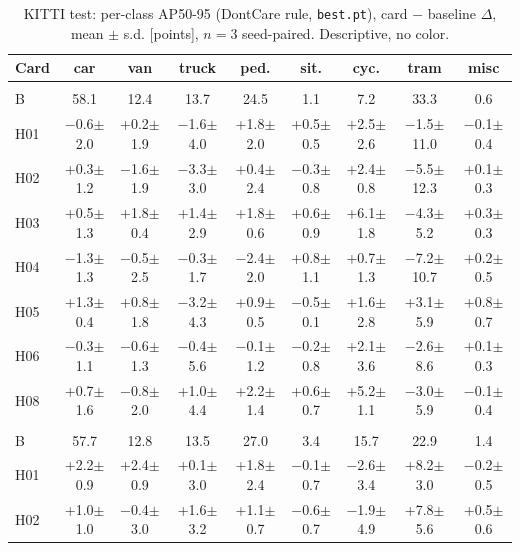 \begin{table}[!htbp]
\centering\small\setlength{\tabcolsep}{2pt}
\caption{KITTI test: per-class AP50-95 (DontCare rule, \texttt{best.pt}), card $-$ baseline $\Delta$, mean $\pm$ s.d. [points], $n=3$ seed-paired. Descriptive, no color.}\label{tab:kitti-sinif}
\begin{tabularx}{\textwidth}{>{\raggedright\arraybackslash}X c c c c c c c c}
\toprule
Card & car & van & truck & ped. & sit. & cyc. & tram & misc \\
\midrule
\multicolumn{9}{@{}l}{\textbf{YOLO26n}} \\
B & 58.1 & 12.4 & 13.7 & 24.5 & 1.1 & 7.2 & 33.3 & 0.6 \\
H01 & $-$0.6$\pm$2.0 & +0.2$\pm$1.9 & $-$1.6$\pm$4.0 & +1.8$\pm$2.0 & +0.5$\pm$0.5 & +2.5$\pm$2.6 & $-$1.5$\pm$11.0 & $-$0.1$\pm$0.4 \\
H02 & +0.3$\pm$1.2 & $-$1.6$\pm$1.9 & $-$3.3$\pm$3.0 & +0.4$\pm$2.4 & $-$0.3$\pm$0.8 & +2.4$\pm$0.8 & $-$5.5$\pm$12.3 & +0.1$\pm$0.3 \\
H03 & +0.5$\pm$1.3 & +1.8$\pm$0.4 & +1.4$\pm$2.9 & +1.8$\pm$0.6 & +0.6$\pm$0.9 & +6.1$\pm$1.8 & $-$4.3$\pm$5.2 & +0.3$\pm$0.3 \\
H04 & $-$1.3$\pm$1.3 & $-$0.5$\pm$2.5 & $-$0.3$\pm$1.7 & $-$2.4$\pm$2.0 & +0.8$\pm$1.1 & +0.7$\pm$1.3 & $-$7.2$\pm$10.7 & +0.2$\pm$0.5 \\
H05 & +1.3$\pm$0.4 & +0.8$\pm$1.8 & $-$3.2$\pm$4.3 & +0.9$\pm$0.5 & $-$0.5$\pm$0.1 & +1.6$\pm$2.8 & +3.1$\pm$5.9 & +0.8$\pm$0.7 \\
H06 & $-$0.3$\pm$1.1 & $-$0.6$\pm$1.3 & $-$0.4$\pm$5.6 & $-$0.1$\pm$1.2 & $-$0.2$\pm$0.8 & +2.1$\pm$3.6 & $-$2.6$\pm$8.6 & +0.1$\pm$0.3 \\
H08 & +0.7$\pm$1.6 & $-$0.8$\pm$2.0 & +1.0$\pm$4.4 & +2.2$\pm$1.4 & +0.6$\pm$0.7 & +5.2$\pm$1.1 & $-$3.0$\pm$5.9 & $-$0.1$\pm$0.4 \\
\midrule
\multicolumn{9}{@{}l}{\textbf{YOLO11s}} \\
B & 57.7 & 12.8 & 13.5 & 27.0 & 3.4 & 15.7 & 22.9 & 1.4 \\
H01 & +2.2$\pm$0.9 & +2.4$\pm$0.9 & +0.1$\pm$3.0 & +1.8$\pm$2.4 & $-$0.1$\pm$0.7 & $-$2.6$\pm$3.4 & +8.2$\pm$3.0 & $-$0.2$\pm$0.5 \\
H02 & +1.0$\pm$1.0 & $-$0.4$\pm$3.0 & +1.6$\pm$3.2 & +1.1$\pm$0.7 & $-$0.6$\pm$0.7 & $-$1.9$\pm$4.9 & +7.8$\pm$5.6 & +0.5$\pm$0.6 \\

\end{tabularx}
\end{table}
